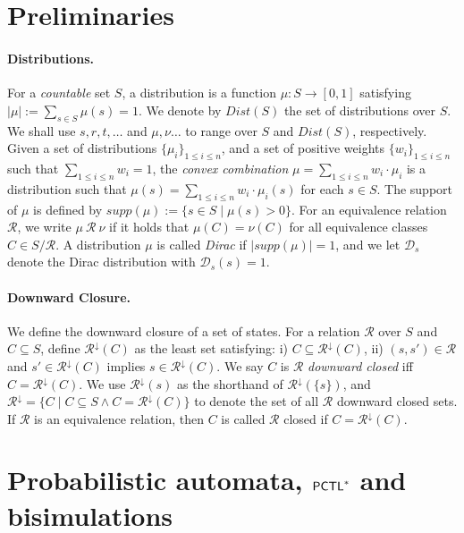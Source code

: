 \documentclass{LMCS}
\newcommand{\PCTL}{{\sf PCTL}}
\newcommand{\MC}[1]{\mathcal{#1}}
\newcommand{\DIRAC}[1]{\mathcal{D}_{#1}}
\newcommand{\ABS}[1]{|#1|}
\newcommand{\DOWNWARD}[2]{#1^{\downarrow}#2}
\begin{document}
\section{Preliminaries}\label{sec:pre}
\paragraph{Distributions.}
For a \emph{countable} set $S$, a distribution is a function $\mu:S\to
[0,1]$ satisfying $\ABS{\mu}:=\sum_{s\in S}\mu(s)= 1$. We denote by
$\mathit{Dist}(S)$ the set of distributions over $S$. We shall use
$s,r,t,\ldots$ and $\mu,\nu\ldots$ to range over $S$ and
$\mathit{Dist}(S)$, respectively. Given a set of distributions
$\{\mu_i\}_{1\leq i\leq n}$, and a set of positive weights
$\{w_i\}_{1\leq i\leq n}$ such that $\sum_{1\leq i\leq n}w_i=1$, the
\emph{convex combination} $\mu=\sum_{1\leq i\leq n}w_i\cdot\mu_i$ is
a distribution such that $\mu(s)=\sum_{1\leq i\leq
  n}w_i\cdot\mu_i(s)$ for each $s\in S$. The support of $\mu$ is
defined by $\mathit{supp}(\mu):=\{s\in S \mid \mu(s)>0\}$. For an
equivalence relation $\MC{R}$, we write $\mu~\MC{R}~\nu$ if it holds
that $\mu(C)=\nu(C)$ for all equivalence classes $C\in S/\MC{R}$. A
distribution $\mu$ is called \emph{Dirac} if $|\mathit{supp}(\mu)|=1$,
and we let $\DIRAC{s}$ denote the Dirac distribution with
$\DIRAC{s}(s)=1$.


\paragraph{Downward Closure.} We define the downward closure of
a set of states.
For a relation $\MC{R}$ over $S$ and $C\subseteq S$, define
$\DOWNWARD{\MC{R}}{(C)}$ as the least set satisfying:
i) $C\subseteq\DOWNWARD{\MC{R}}{(C)}$, ii) $(s,s')\in\MC{R}$ and
$s'\in \DOWNWARD{\MC{R}}{(C)}$ implies $s\in\DOWNWARD{\MC{R}}{(C)}$.
We say $C$ is $\MC{R}$ \emph{downward closed} iff $C=\DOWNWARD{\MC{R}}{(C)}$.
We use $\DOWNWARD{\MC{R}}{(s)}$ as the shorthand of $\DOWNWARD{\MC{R}}{(\{s\})}$, 
and $\DOWNWARD{\MC{R}}{}=\{C\mid C\subseteq S\land C=\DOWNWARD{\MC{R}}{(C)}\}$ to 
denote the set of all $\MC{R}$ downward closed sets. If $\MC{R}$ is an equivalence
relation, then $C$ is called $\MC{R}$ closed if $C=\DOWNWARD{\MC{R}}(C)$.

\section{Probabilistic automata, \texorpdfstring{$\PCTL^{*}$}{PCTL*} and bisimulations}\label{sec:pa}
\end{document}
